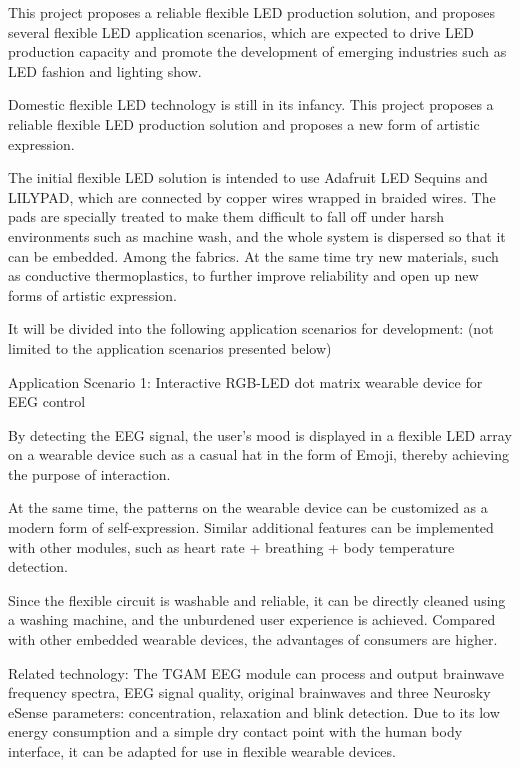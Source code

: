 
\begin{eabstract}
This project proposes a reliable flexible LED production solution, and proposes several flexible LED application scenarios, which are expected to drive LED production capacity and promote the development of emerging industries such as LED fashion and lighting show.

Domestic flexible LED technology is still in its infancy. This project proposes a reliable flexible LED production solution and proposes a new form of artistic expression.

The initial flexible LED solution is intended to use Adafruit LED Sequins and LILYPAD, which are connected by copper wires wrapped in braided wires. The pads are specially treated to make them difficult to fall off under harsh environments such as machine wash, and the whole system is dispersed so that it can be embedded. Among the fabrics. At the same time try new materials, such as conductive thermoplastics, to further improve reliability and open up new forms of artistic expression.

It will be divided into the following application scenarios for development: (not limited to the application scenarios presented below)

{\heiti Application Scenario 1: Interactive RGB-LED dot matrix wearable device for EEG control }

By detecting the EEG signal, the user's mood is displayed in a flexible LED array on a wearable device such as a casual hat in the form of Emoji, thereby achieving the purpose of interaction.

At the same time, the patterns on the wearable device can be customized as a modern form of self-expression. Similar additional features can be implemented with other modules, such as heart rate + breathing + body temperature detection.

Since the flexible circuit is washable and reliable, it can be directly cleaned using a washing machine, and the unburdened user experience is achieved. Compared with other embedded wearable devices, the advantages of consumers are higher.

Related technology:
The TGAM EEG module can process and output brainwave frequency spectra, EEG signal quality, original brainwaves and three Neurosky eSense parameters: concentration, relaxation and blink detection. Due to its low energy consumption and a simple dry contact point with the human body interface, it can be adapted for use in flexible wearable devices.


\end{eabstract}
